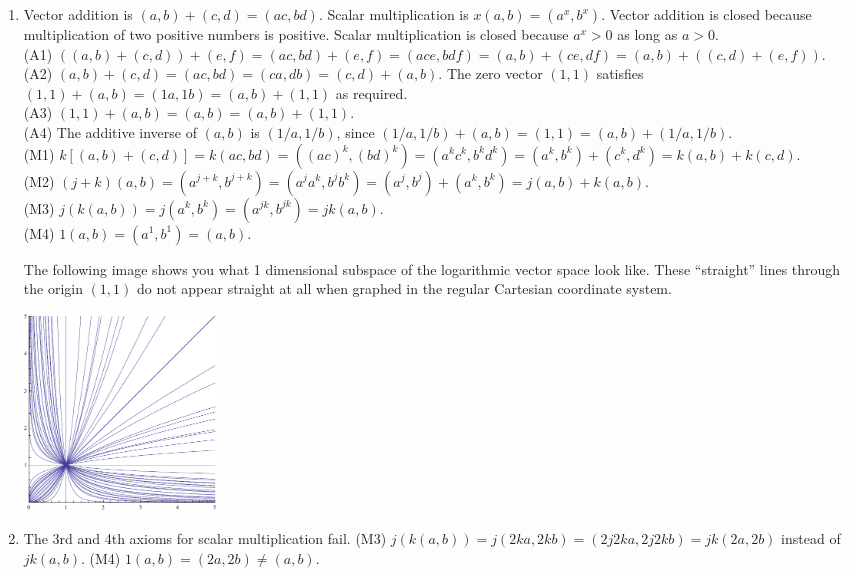 {\begin{multicols}{2}
\begin{enumerate}
\begin{enumerate}
	You could change ``the entire real number line'' to any interval, and nothing above would change.
	
	\item Vector addition is $(a,b)+(c,d) = (ac,bd)$.  Scalar multiplication  is $x(a,b) = (a^x, b^x)$. Vector addition is closed because multiplication of two positive numbers is positive.  Scalar multiplication  is closed because $a^x> 0$ as long as $a>0$. 
\\	(A1) $((a,b)+(c,d))+(e,f) =(ac,bd)+(e,f) =(ace,bdf) =(a,b)+(ce,df) = (a,b)+((c,d)+(e,f))$. 
\\	(A2)  $(a,b)+(c,d) =(ac,bd) = (ca,db) = (c,d)+(a,b)$. The zero vector $(1,1)$ satisfies $(1,1)+(a,b) = (1a,1b)=(a,b)+(1,1)$ as required.
\\	(A3) $(1,1)+(a,b) = (a,b) = (a,b)+(1,1)$.
\\	(A4) The additive inverse of $(a,b)$ is $(1/a,1/b)$, since $(1/a,1/b)+(a,b) = (1,1) = (a,b)+(1/a,1/b)$.
\\	(M1) $k[(a,b)+(c,d)] = k(ac,bd) = ((ac)^k,(bd)^k) = (a^kc^k,b^kd^k) = (a^k,b^k)+(c^k,d^k)=k(a,b)+k(c,d)$.
\\	(M2) $(j+k)(a,b) = (a^{j+k},b^{j+k}) = (a^ja^k,b^jb^k) = (a^j,b^j)+(a^k,b^k) = j(a,b)+k(a,b)$.
\\	(M3) $j(k(a,b)) = j(a^k,b^k)=(a^{jk},b^{jk})=jk(a,b)$.
\\	(M4) $1(a,b) = (a^1,b^1)=(a,b)$.
	  
	  The following image shows you what 1 dimensional subspace of the logarithmic vector space look like.  These ``straight'' lines through the origin $(1,1)$ do not appear straight at all when graphed in the regular Cartesian coordinate system.
	  
	  \includegraphics[width=2in]{03-Patterns/support/logspace-picture}

	\item The 3rd and 4th axioms for scalar multiplication fail. 
	(M3) $j(k(a,b)) = j(2ka,2kb)=(2j2ka,2j2kb)=jk(2a,2b)$ instead of $jk(a,b)$.
	(M4) $1(a,b) = (2a,2b)\neq (a,b)$.
	

\end{enumerate}
\end{enumerate}
\end{multicols}}
